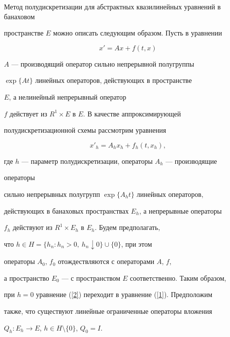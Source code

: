 \label{begin}





Метод полудискретизации для абстрактных квазилинейных уравнений в банаховом


пространстве $E$ можно описать следующим образом. Пусть в уравнении


\begin{equation}


\label{1}


x'=Ax+f(t,x)


\end{equation}


$A$ --- производящий оператор сильно непрерывной полугруппы 


$\exp\{ At \}$ линейных операторов, действующих в пространстве


$E$, а нелинейный непрерывный оператор


$f$ действует из $R^{1}\times E$ в $E$. В качестве аппроксимирующей 


полудискретизационной схемы рассмотрим уравнения


\begin{equation}


\label{2}


x'_{h} =A_{h}x_{h}+f_{h}(t,x_{h}),


\end{equation}


где $h$ --- параметр полудискретизации, операторы $A_h$ --- производящие


операторы


сильно непрерывных полугрупп $\exp\{ A_{h}t \}$ линейных операторов,


действующих в банаховых пространствах $E_{h}$, а непрерывные операторы 


$f_{h}$ действуют из $R^{1}\times E_{h}$ в $E_{h}$. Будем предполагать,


что $h \in H=\{h_n : h_n>0, \ h_n \downarrow 0 \}\cup \{ 0 \}$, при этом 


операторы $A_{0}$, $f_{0}$ отождествляются с операторами $A$, $f$, 


а пространство $E_0$ --- с пространством $E$ соответственно. Таким образом,


при $h=0$ уравнение (\ref{2}) переходит в уравнение (\ref{1}). Предположим


также, что существуют линейные ограниченные операторы вложения 


$Q_h : E_h \to E$, $h\in H\setminus \{ 0 \}$, $Q_0=I$. 


